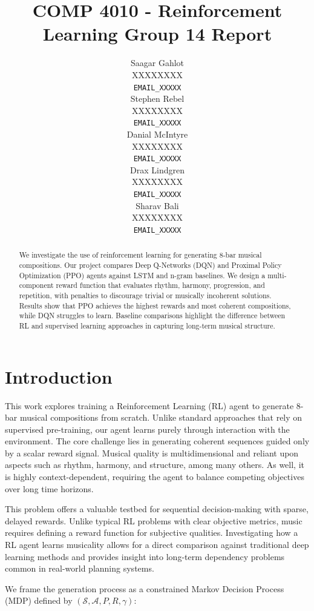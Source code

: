 \documentclass{article}
\title{COMP 4010 - Reinforcement Learning Group 14 Report}
\author{
  Saagar Gahlot \\
  XXXXXXXX \\
  \texttt{EMAIL_XXXXX} \\
  \And
  Stephen Rebel \\
  XXXXXXXX \\
  \texttt{EMAIL_XXXXX} \\
  \And
  Danial McIntyre \\
  XXXXXXXX \\
  \texttt{EMAIL_XXXXX} \\
  \And
  Drax Lindgren \\
  XXXXXXXX \\
  \texttt{EMAIL_XXXXX} \\
  \And
  Sharav Bali \\
  XXXXXXXX \\
  \texttt{EMAIL_XXXXX} \\
}
\begin{document}
\maketitle

\begin{abstract}
We investigate the use of reinforcement learning for generating 8-bar musical compositions. Our project compares Deep Q-Networks (DQN) and Proximal Policy Optimization (PPO) agents against LSTM and n-gram baselines. We design a multi-component reward function that evaluates rhythm, harmony, progression, and repetition, with penalties to discourage trivial or musically incoherent solutions. Results show that PPO achieves the highest rewards and most coherent compositions, while DQN struggles to learn. Baseline comparisons highlight the difference between RL and supervised learning approaches in capturing long-term musical structure.
\end{abstract}


\section{Introduction}

This work explores training a Reinforcement Learning (RL) agent to generate 8-bar musical compositions from scratch. Unlike standard approaches that rely on supervised pre-training, our agent learns purely through interaction with the environment. The core challenge lies in generating coherent sequences guided only by a scalar reward signal. Musical quality is multidimensional and reliant upon aspects such as rhythm, harmony, and structure, among many others. As well, it is highly context-dependent, requiring the agent to balance competing objectives over long time horizons.

This problem offers a valuable testbed for sequential decision-making with sparse, delayed rewards. Unlike typical RL problems with clear objective metrics, music requires defining a reward function for subjective qualities. Investigating how a RL agent learns musicality allows for a direct comparison against traditional deep learning methods and provides insight into long-term dependency problems common in real-world planning systems.

We frame the generation process as a constrained Markov Decision Process (MDP) defined by $(\mathcal{S}, \mathcal{A}, P, R, \gamma)$:
\end{document}
